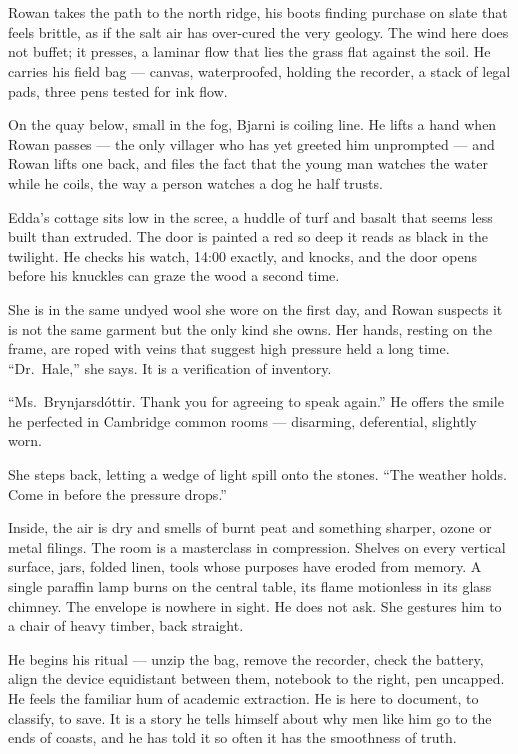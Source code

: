 \documentclass[11pt,oneside]{book}
\begin{document}
\chapter{}

Rowan takes the path to the north ridge, his boots finding purchase on
slate that feels brittle, as if the salt air has over-cured the very
geology. The wind here does not buffet; it presses, a laminar flow that
lies the grass flat against the soil. He carries his field bag ---
canvas, waterproofed, holding the recorder, a stack of legal pads, three
pens tested for ink flow.

On the quay below, small in the fog, Bjarni is coiling line. He lifts a
hand when Rowan passes --- the only villager who has yet greeted him
unprompted --- and Rowan lifts one back, and files the fact that the
young man watches the water while he coils, the way a person watches a
dog he half trusts.

Edda's cottage sits low in the scree, a huddle of turf and basalt that
seems less built than extruded. The door is painted a red so deep it
reads as black in the twilight. He checks his watch, 14:00 exactly, and
knocks, and the door opens before his knuckles can graze the wood a
second time.

She is in the same undyed wool she wore on the first day, and Rowan
suspects it is not the same garment but the only kind she owns. Her
hands, resting on the frame, are roped with veins that suggest high
pressure held a long time.
``Dr.~Hale,'' she says. It is a verification of inventory.

``Ms.~Brynjarsdóttir. Thank you for agreeing to speak again.'' He offers
the smile he perfected in Cambridge common rooms --- disarming,
deferential, slightly worn.

She steps back, letting a wedge of light spill onto the stones. ``The
weather holds. Come in before the pressure drops.''

Inside, the air is dry and smells of burnt peat and something sharper,
ozone or metal filings. The room is a masterclass in compression.
Shelves on every vertical surface, jars, folded linen, tools whose
purposes have eroded from memory. A single paraffin lamp burns on the
central table, its flame motionless in its glass chimney. The envelope
is nowhere in sight. He does not ask. She gestures him to a chair of
heavy timber, back straight.

He begins his ritual --- unzip the bag, remove the recorder, check the
battery, align the device equidistant between them, notebook to the
right, pen uncapped. He feels the familiar hum of academic extraction.
He is here to document, to classify, to save. It is a story he tells
himself about why men like him go to the ends of coasts, and he has told
it so often it has the smoothness of truth.
\end{document}
